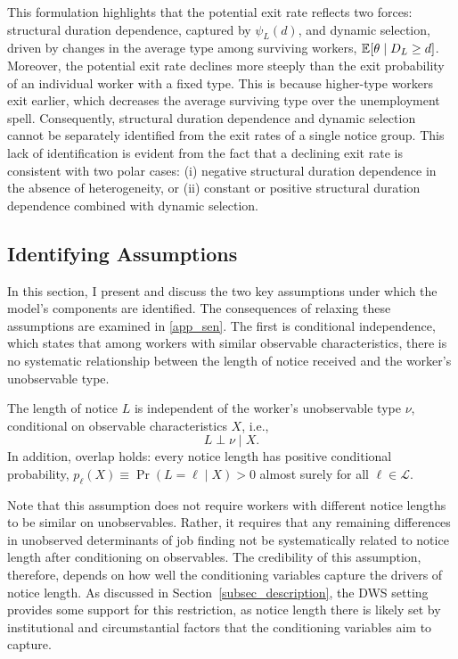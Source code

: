 \documentclass{div}
\begin{document}
This formulation highlights that the potential exit rate reflects two forces: structural duration dependence, captured by $\psi_L(d)$, and dynamic selection, driven by changes in the average type among surviving workers, $\E[\theta \mid D_L \geq d]$. Moreover, the potential exit rate declines more steeply than the exit probability of an individual worker with a fixed type. This is because higher-type workers exit earlier, which decreases the average surviving type over the unemployment spell. Consequently, structural duration dependence and dynamic selection cannot be separately identified from the exit rates of a single notice group. This lack of identification is evident from the fact that a declining exit rate is consistent with two polar cases: (i) negative structural duration dependence in the absence of heterogeneity, or (ii) constant or positive structural duration dependence combined with dynamic selection.

\subsection{Identifying Assumptions}\label{subsec_assumps}

In this section, I present and discuss the two key assumptions under which the model's components are identified. The consequences of relaxing these assumptions are examined in \ref{app_sen}. The first is conditional independence, which states that among workers with similar observable characteristics, there is no systematic relationship between the length of notice received and the worker's unobservable type.

\begin{assump}\label{assump_independence}
The length of notice $L$ is independent of the worker's unobservable type $\nu$, conditional on observable characteristics $X$, i.e.,
$$
L \perp \nu \mid X.
$$
In addition, overlap holds: every notice length has positive conditional probability, $p_\ell(X) \equiv \Pr(L = \ell \mid X) > 0$ almost surely for all $\ell \in \mathcal{L}$.
\end{assump}

Note that this assumption does not require workers with different notice lengths to be similar on unobservables. Rather, it requires that any remaining differences in unobserved determinants of job finding not be systematically related to notice length after conditioning on observables. The credibility of this assumption, therefore, depends on how well the conditioning variables capture the drivers of notice length. As discussed in Section~\ref{subsec_description}, the DWS setting provides some support for this restriction, as notice length there is likely set by institutional and circumstantial factors that the conditioning variables aim to capture.
\end{document}
